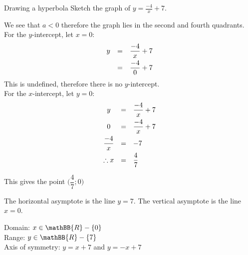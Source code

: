 \pagebreak
\begin{wex}
{Drawing a hyperbola}
{
Sketch the graph of $y=\frac{-4}{x}+7$.}
{
We see that $a<0$ therefore the graph lies in the second and fourth quadrants.
For the $y$-intercept, let $x=0$:
\begin{equation*}
 \begin{array}{ccc}
 \hfill  y &= & \dfrac{-4}{x}+7 \vspace{4pt}\hfill \\
 \hfill &= & \dfrac {-4}{0} +7  \hfill
 \end{array}
\end{equation*}
This is undefined, therefore there is no $y$-intercept. \\
For the $x$-intercept, let $y=0$:
\begin{equation*}
 \begin{array}{ccl}
 y &=&  \dfrac{-4}{x}+7\vspace{4pt}\\
 0 &=&  \dfrac{-4}{x}+7\vspace{4pt}\\ 
 \dfrac{-4}{x} &=& -7\vspace{4pt} \\
\therefore x &= &\dfrac{4}{7}
 \end{array}
\end{equation*}

This gives the point $\Big(\dfrac{4}{7};0\Big)$


The horizontal asymptote is the line $y=7$. The vertical asymptote is the line $x=0$.

\par
\setcounter{subfigure}{0}
\begin{center}
\end{center}


Domain: $x \in \mathBB{R} - \{0\}$\\
Range: $y \in \mathBB{R} - \{7\}$\\
Axis of symmetry: $y=x+7$ and $y=-x+7$
}
\end{wex}

